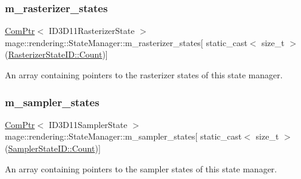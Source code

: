 \subsubsection{\texorpdfstring{m\+\_\+rasterizer\+\_\+states}{m\_rasterizer\_states}}
{\footnotesize\ttfamily \hyperlink{namespacemage_ae74f374780900893caa5555d1031fd79}{Com\+Ptr}$<$ I\+D3\+D11\+Rasterizer\+State $>$ mage\+::rendering\+::\+State\+Manager\+::m\+\_\+rasterizer\+\_\+states\mbox{[} static\+\_\+cast$<$ size\+\_\+t $>$(\hyperlink{namespacemage_1_1rendering_ac878731f5dc22a3a36ccfbfc77c3facaae93f994f01c537c4e2f7d8528c3eb5e9}{Rasterizer\+State\+I\+D\+::\+Count})\mbox{]}\hspace{0.3cm}{\ttfamily [private]}}

An array containing pointers to the rasterizer states of this state manager. \hypertarget{classmage_1_1rendering_1_1_state_manager_ac0d76e363936a196acc6fafa09acc73d}{}\label{classmage_1_1rendering_1_1_state_manager_ac0d76e363936a196acc6fafa09acc73d} 
\subsubsection{\texorpdfstring{m\+\_\+sampler\+\_\+states}{m\_sampler\_states}}
{\footnotesize\ttfamily \hyperlink{namespacemage_ae74f374780900893caa5555d1031fd79}{Com\+Ptr}$<$ I\+D3\+D11\+Sampler\+State $>$ mage\+::rendering\+::\+State\+Manager\+::m\+\_\+sampler\+\_\+states\mbox{[} static\+\_\+cast$<$ size\+\_\+t $>$(\hyperlink{namespacemage_1_1rendering_a6f80181126db61dbb8b528a6894eb658ae93f994f01c537c4e2f7d8528c3eb5e9}{Sampler\+State\+I\+D\+::\+Count})\mbox{]}\hspace{0.3cm}{\ttfamily [private]}}

An array containing pointers to the sampler states of this state manager. 
